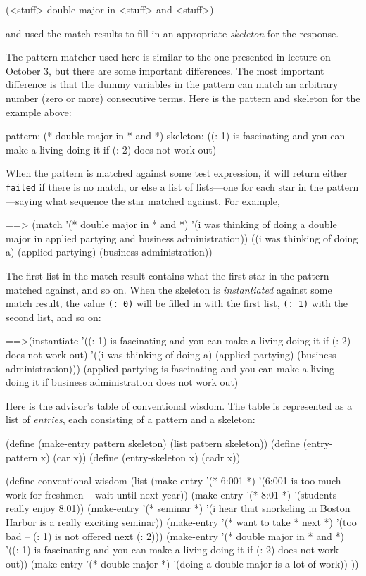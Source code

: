 \beginlisp
(<stuff> double major in <stuff> and <stuff>)
\endlisp

\noindent
and used the match results to fill in an appropriate {\em skeleton}
for the response.

The pattern matcher used here is similar to the one presented in
lecture on October 3, but there are some important differences.  The
most important difference is that the dummy variables in the pattern
can match an arbitrary number (zero or more) consecutive terms.  Here
is the pattern and skeleton for the example above:

\beginlisp
pattern:  (* double major in * and *)
skeleton: ((: 1) is fascinating and you can make a living doing it
            if (: 2) does not work out)
\endlisp

When the pattern is matched against some test expression, it will
return either {\tt failed} if there is no match, or else a list of
lists---one for each star in the pattern---saying what sequence the
star matched against.  For example,

\beginlisp
==> (match '(* double major in * and *)
           '(i was thinking of doing a double major in
             applied partying and business administration))
\null
 ((i was thinking of doing a)
  (applied partying)
  (business administration))
\endlisp

The first list in the match result contains what the first star in the
pattern matched against, and so on.  When the skeleton is {\em
instantiated} against some match result, the value {\tt (: 0)} will be
filled in with the first list, {\tt (: 1)} with the second list, and
so on:

\beginlisp
==>(instantiate
    '((: 1) is fascinating and you can make
       a living doing it if (: 2) does not work out)
    '((i was thinking of doing a)
      (applied partying)
      (business administration)))
\null
(applied partying is fascinating and you can make a living
  doing it if business administration does not work out)
\endlisp

Here is the advisor's table of conventional wisdom.  The table is
represented as a list of {\em entries}, each consisting of a pattern
and a skeleton:

\beginlisp
(define (make-entry pattern skeleton)
  (list pattern skeleton))
\null
(define (entry-pattern  x) (car  x))
(define (entry-skeleton x) (cadr x))
\endlisp

\pagebreak

\beginlisp
(define conventional-wisdom
  (list
   (make-entry
    '(* 6:001 *)
    '(6:001 is too much work for freshmen -- wait until next year))
   (make-entry
    '(* 8:01 *)
    '(students really enjoy 8:01))
   (make-entry
    '(* seminar *)
    '(i hear that snorkeling in Boston Harbor is a really 
      exciting seminar))
   (make-entry
    '(* want to take * next *)
    '(too bad -- (: 1) is not offered next (: 2)))
   (make-entry
    '(* double major in * and *)
    '((: 1) is fascinating and you can make a living
       doing it if (: 2) does not work out))
   (make-entry
    '(* double major *)
    '(doing a double major is a lot of work))
   ))
\endlisp

